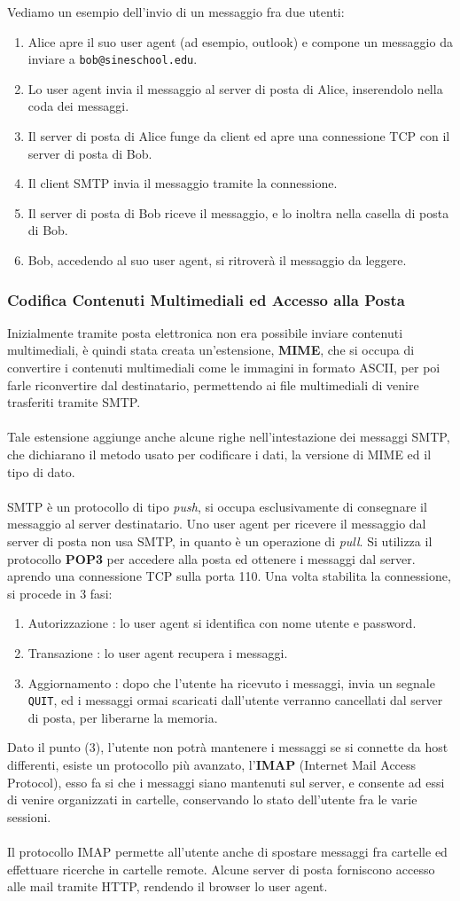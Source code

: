 \documentclass[12pt, letterpaper]{article}
\newcommand{\code}[1]{\colorbox{light-gray}{\texttt{#1}}}
\newcommand{\acc}{\\\hphantom{}\\}
\begin{document}
Vediamo un esempio dell'invio di un messaggio fra due utenti:\begin{enumerate}
    \item Alice apre il suo user agent (ad esempio, outlook) e compone un messaggio da
          inviare a \code{bob@sineschool.edu}.
    \item Lo user agent invia il messaggio al server di posta di Alice, inserendolo nella coda dei messaggi.
    \item Il server di posta di Alice funge da client ed apre una connessione TCP con il server di posta
          di Bob.
    \item Il client SMTP invia il messaggio tramite la connessione.
    \item Il server di posta di Bob riceve il messaggio, e lo inoltra nella casella di posta di Bob.
    \item Bob, accedendo al suo user agent, si ritroverà il messaggio da leggere.
\end{enumerate}
\subsubsection{Codifica Contenuti Multimediali ed Accesso alla Posta}
Inizialmente tramite posta elettronica non era possibile inviare contenuti multimediali, è quindi stata creata
un'estensione, \textbf{MIME}, che si occupa di convertire i contenuti multimediali come le immagini in
formato ASCII, per poi farle riconvertire dal destinatario, permettendo ai file multimediali di venire
trasferiti tramite SMTP.\acc
Tale estensione aggiunge anche alcune righe nell'intestazione dei messaggi SMTP, che dichiarano il
metodo usato per codificare i dati, la versione di MIME ed il tipo di dato.\acc
SMTP è un protocollo di tipo \textit{push}, si occupa esclusivamente di consegnare il messaggio
al server destinatario. Uno user agent per ricevere il messaggio dal server di posta non usa SMTP, in
quanto è un operazione di \textit{pull}. Si utilizza il protocollo \textbf{POP3} per accedere alla posta
ed ottenere i messaggi dal server. aprendo una connessione TCP sulla porta 110. Una volta stabilita la
connessione, si procede in 3 fasi:\begin{enumerate}
    \item Autorizzazione : lo user agent si identifica con nome utente e password.
    \item Transazione : lo user agent recupera i messaggi.
    \item Aggiornamento : dopo che l'utente ha ricevuto i messaggi, invia un segnale \code{QUIT}, ed i
          messaggi ormai scaricati dall'utente verranno cancellati dal server di posta, per liberarne
          la memoria.
\end{enumerate}
Dato il punto (3), l'utente non potrà mantenere i messaggi se si connette da host differenti,
esiste un protocollo più avanzato, l'\textbf{IMAP} (Internet Mail Access Protocol), esso fa si che i messaggi
siano mantenuti sul server, e consente ad essi di venire organizzati in cartelle, conservando lo stato
dell'utente fra le varie sessioni.\acc Il protocollo IMAP permette all'utente anche di spostare messaggi
fra cartelle ed effettuare ricerche in cartelle remote. Alcune server di posta forniscono accesso alle mail
tramite HTTP, rendendo il browser lo user agent.
\end{document}
